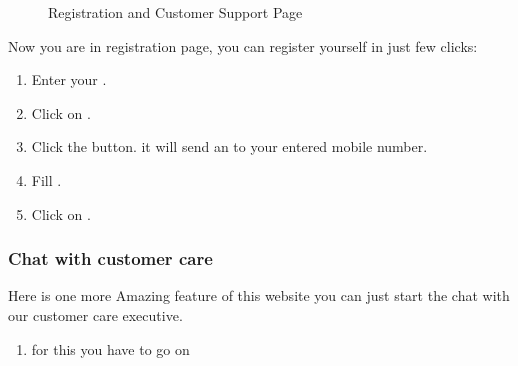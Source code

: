 \documentclass[a4paper,10pt,english]{report}
\begin{document}
\begin{figure}[htbp]
\centering

\noindent{}
\end{figure}

\begin{figure}[htbp]
\centering
\capstart

\noindent{}
\caption{Registration and Customer Support Page}\label{\detokenize{register:id3}}\label{\detokenize{register:id1}}\end{figure}

Now you are in registration page, you can register yourself in just few clicks:
\begin{enumerate}
\def\theenumi{\arabic{enumi}}
\def\labelenumi{\theenumi .}
\makeatletter\def\p@enumii{\p@enumi \theenumi .}\makeatother
\item {} 
Enter your .

\item {} 
Click on .

\item {} 
Click the  button. it will send an  to your entered mobile number.

\item {} 
Fill .

\item {} 
Click on .

\end{enumerate}


\subsubsection{Chat with customer care}
\label{\detokenize{register:chat-with-customer-care}}\label{\detokenize{register:id2}}\label{\detokenize{register:my-reference-label}}
Here is one more Amazing feature of this website you can just start the chat with our customer care executive.
\begin{enumerate}
\def\theenumi{\arabic{enumi}}
\def\labelenumi{\theenumi .}
\makeatletter\def\p@enumii{\p@enumi \theenumi .}\makeatother
\setcounter{enumi}{5}
\item {} 
for this you have to go on 

\end{enumerate}
\end{document}
